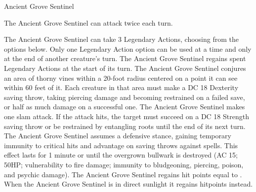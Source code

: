\documentclass[letterpaper,openany,twoside,twocolumn]{book}
\begin{document}
\begin{DndMonster}[float*=b,width=\textwidth +8pt]{Ancient Grove Sentinel}
\begin{multicols}{2}
	
	The Ancient Grove Sentinel can attack twice each turn.
	
	\DndMonsterAttack[
      name=Slam,
      distance=melee, %
      mod=+12,
      reach=10,
      targets=one target,
      dmg=\DndDice{4d8 + 7},
      dmg-type=bludgeoning,
    ]
    
    \DndMonsterAttack[
      name=Vine Whip,
      distance=melee, %
      mod=+8,
      reach=20,
      targets=one target,
      dmg=\DndDice{3d8 + 5},
      dmg-type=bludgeoning,
      extra={. The target must succeed a DC 18 Strength saving throw or be pulled up to 10 feet toward the Sentinel. If the target is Large or smaller, it is also grappled}
    ]
	
    The Ancient Grove Sentinel can take 3 Legendary Actions, choosing from the options below. Only one Legendary Action option can be used at a time and only at the end of another creature's turn. The Ancient Grove Sentinel regains spent Legendary Actions at the start of its turn.
    The Ancient Grove Sentinel conjures an area of thorny vines within a 20-foot radius centered on a point it can see within 60 feet of it. Each creature in that area must make a DC 18 Dexterity saving throw, taking  piercing damage and becoming restrained on a failed save, or half as much damage on a successful one.
    The Ancient Grove Sentinel makes one slam attack. If the attack hits, the target must succeed on a DC 18 Strength saving throw or be restrained by entangling roots until the end of its next turn.
	The Ancient Grove Sentinel assumes a defensive stance, gaining temporary immunity to critical hits and advantage on saving throws against spells. This effect lasts for 1 minute or until the overgrown bullwark is destroyed (AC 15; 50HP; vulnerability to fire damage; immunity to bludgeoning, piercing, poison, and psychic damage).
    The Ancient Grove Sentinel regains hit points equal to . When the Ancient Grove Sentinel is in direct sunlight it regains  hitpoints instead.
      
\end{multicols}\end{DndMonster}
\end{document}
